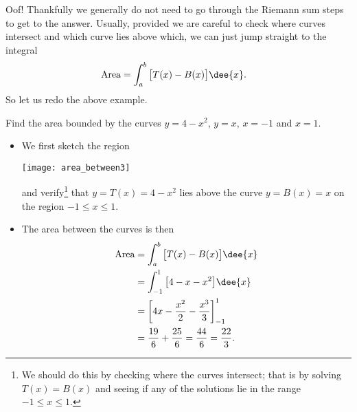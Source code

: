 Oof! Thankfully we generally do not need to go through the Riemann sum steps to get to
the answer. Usually, provided we are careful to check where curves intersect and which
curve lies above which, we can just jump straight to the integral
\begin{align}\label{eqn areabetween}
  \text{Area} &= \int_a^b \big[T(x)-B(x)\big]\dee{x}.
\end{align}
So let us redo the above example.
\begin{eg}
              \label{eg areabetween riemann again}
 Find the area bounded by the curves $y=4-x^2$, $y=x$, $x=-1$ and $x=1$.

\soln
\begin{itemize}
 \item We first sketch the region
\begin{efig}
 \centering
\texttt{[image: area\_between3]}
\end{efig}
and verify\footnote{We should do this by checking where the curves intersect; that is by
solving $T(x)=B(x)$ and seeing if any of the solutions lie in the range $-1\leq x \leq
1$.} that $y=T(x)=4-x^2$ lies above the curve $y=B(x)=x$ on the region $-1\leq x\leq 1$.

\item The area between the curves is then
\begin{align*}
\text{Area} &= \int_a^b \big[T(x)-B(x)\big]\dee{x}\\
&=\int_{-1}^1\big[4-x-x^2\big]\dee{x} \\
&=\bigg[4x - \frac{x^2}{2} - \frac{x^3}{3} \bigg]_{-1}^1\\
&= \frac{19}{6} + \frac{25}{6} = \frac{44}{6} = \frac{22}{3}.
\end{align*}
\end{itemize}

\end{eg}


